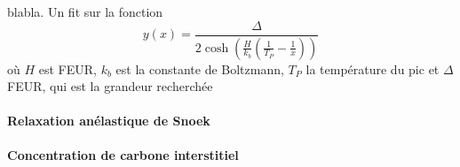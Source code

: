 blabla. Un fit sur la fonction
\begin{equation}
    y(x) = \frac{\Delta}{2 \cosh \left(\frac{H}{k_b}\left(\frac{1}{T_P} - \frac{1}{x}\right)\right)}
    \label{eq:fit_q1}
\end{equation}
où \(H\) est FEUR, \(k_b\) est la constante de Boltzmann, \(T_P\) la température du pic et \(\Delta\) FEUR, qui est la grandeur recherchée

\paragraph{Relaxation anélastique de Snoek}

\paragraph{Concentration de carbone interstitiel}
